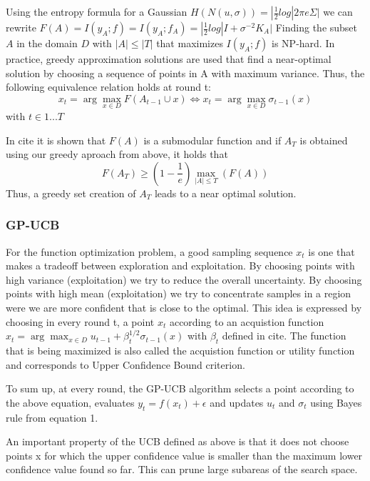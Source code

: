 \documentclass[10pt,journal,a4paper]{IEEEtran}
\begin{document}
Using the entropy formula for a Gaussian $H(N(u,\sigma)) = |\frac{1}{2}log|2\pi e \Sigma|$ we can rewrite $F(A) =I(y_A; f)  = I(y_A; f_A) = |\frac{1}{2} log|I + \sigma^{-2} K_A|$
Finding the subset $A$ in the domain $D$ with $|A| \leq |T|$ that maximizes $I(y_A; f)$ is NP-hard. In practice, greedy approximation solutions are used that find a near-optimal solution by choosing a sequence of points in A with maximum variance. Thus, the following equivalence relation holds at round t:
\begin{equation}
x_t = \arg\max_{x\in D} F(A_{t-1}\cup {x}) \Longleftrightarrow 
x_t = \arg\max_{x\in D}\sigma_{t-1}(x) 
\end{equation}
with $t\in{1...T}$

In cite it is shown that $F(A)$ is a submodular function and if
$A_T$ is obtained using our greedy aproach from above, it holds that
\begin{equation}
	F(A_T) \geq (1-\frac{1}{e}) \max_{|A| \leq T}(F(A))
\end{equation}
Thus, a greedy set creation of $A_T$ leads to a near optimal solution.

\subsubsection{GP-UCB}
For the function optimization problem, a good sampling sequence $x_t$ is one that makes a tradeoff between 
exploration and exploitation. By choosing points with high variance (exploitation) we try to reduce the overall uncertainty.
By choosing points with high mean (exploitation) we try to concentrate samples in a region were we are more confident that is close to the optimal. This idea is expressed by choosing in every round t, a point $x_t$  according to an acquistion function 
$x_t = \arg\max_{x\in D} u_{t-1} + \beta_{t}^{1/2}\sigma_{t-1}(x)$ with $\beta_{t}$ defined in cite. The function that is being maximized is also called the acquistion function or utility function and corresponds to Upper Confidence Bound criterion.

To sum up, at every round, the GP-UCB algorithm selects a point according to the above equation, evaluates $y_t=f(x_t) + \epsilon$ and updates $u_t$ and $\sigma_t$ using Bayes rule from equation 1.

An important property of the UCB defined as above is that it does not choose points x for which the upper confidence value is smaller than the maximum lower confidence value found so far. This can prune large subareas of the search space.
\end{document}

